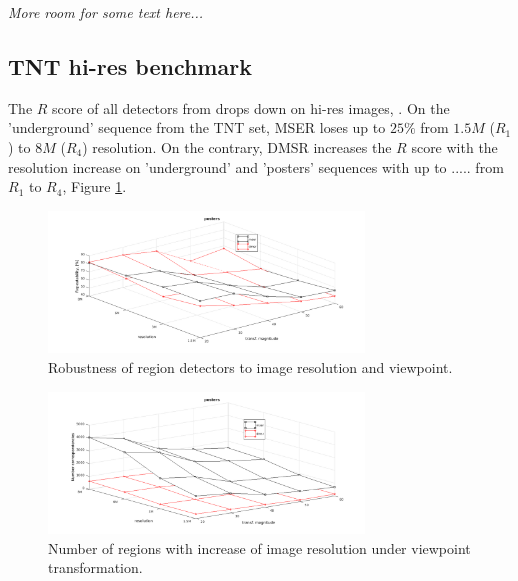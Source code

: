 \documentclass{article}
\begin{document}
{\em More room for some text here...}
\subsection{TNT hi-res benchmark}
\label{ssec:tnt}

The $R$ score of all detectors from \cite{Mikolajczyk:2005} drops down on hi-res images, \cite{CorRos2013}. On the 'underground' sequence from the TNT set, MSER loses up to $25\%$ from $1.5M$ ($R_1$) to $8M$ ($R_4$) resolution. On the contrary, DMSR increases the $R$ score with the resolution increase on 'underground' and 'posters' sequences with up to ..... from $R_1$ to $R_4$, Figure \ref{fig:tnt}. 

\begin{figure}[htb]

\begin{minipage}[b]{.9\linewidth}
  \centering
  \centerline{\includegraphics[width=8.4cm]{./Figs/posters_rep}}
\end{minipage}
\hfill
\caption{Robustness of region detectors to image resolution and viewpoint.}
\label{fig:tnt}
%
\end{figure}
\begin{figure}[htb]

\begin{minipage}[b]{0.9\linewidth}
  \centering
  \centerline{\includegraphics[width=8.4cm]{./Figs/posters_numreg}}
\end{minipage}
\caption{Number of regions with increase of image resolution under viewpoint transformation.}
\label{fig:tnt_numreg}
%
\end{figure}
\end{document}

